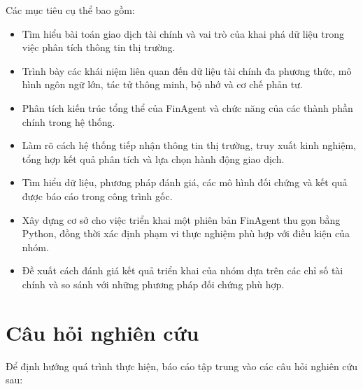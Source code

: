 Các mục tiêu cụ thể bao gồm:

\begin{itemize}
    \item Tìm hiểu bài toán giao dịch tài chính và vai trò của khai phá dữ liệu trong việc phân tích thông tin thị trường.

    \item Trình bày các khái niệm liên quan đến dữ liệu tài chính đa phương thức, mô hình ngôn ngữ lớn, tác tử thông minh, bộ nhớ và cơ chế phản tư.

    \item Phân tích kiến trúc tổng thể của FinAgent và chức năng của các thành phần chính trong hệ thống.

    \item Làm rõ cách hệ thống tiếp nhận thông tin thị trường, truy xuất kinh nghiệm, tổng hợp kết quả phân tích và lựa chọn hành động giao dịch.

    \item Tìm hiểu dữ liệu, phương pháp đánh giá, các mô hình đối chứng và kết quả được báo cáo trong công trình gốc.

    \item Xây dựng cơ sở cho việc triển khai một phiên bản FinAgent thu gọn bằng Python, đồng thời xác định phạm vi thực nghiệm phù hợp với điều kiện của nhóm.

    \item Đề xuất cách đánh giá kết quả triển khai của nhóm dựa trên các chỉ số tài chính và so sánh với những phương pháp đối chứng phù hợp.
\end{itemize}

\section{Câu hỏi nghiên cứu}

Để định hướng quá trình thực hiện, báo cáo tập trung vào các câu hỏi nghiên cứu sau:

